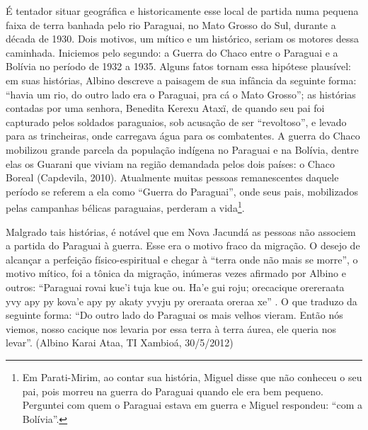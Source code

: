 \documentclass{article}
\begin{document}
\'E tentador situar geogr\'afica e historicamente esse local de partida
numa pequena faixa de terra banhada pelo rio Paraguai, no Mato Grosso
do Sul, durante a d\'ecada de 1930. Dois motivos, um m\'itico e um
hist\'orico, seriam os motores dessa caminhada. Iniciemos pelo segundo:
a Guerra do Chaco entre o Paraguai e a Bol\'ivia no per\'iodo de 1932 a
1935. Alguns fatos tornam essa hip\'otese plaus\'ivel: em suas
hist\'orias, Albino descreve a paisagem de sua inf\^ancia da seguinte
forma: {\textquotedblleft}havia um rio, do outro lado era o Paraguai,
pra c\'a o Mato Grosso{\textquotedblright}; as hist\'orias contadas por
uma senhora, Benedita Kerexu Atax\"i, de quando seu pai foi capturado
pelos soldados paraguaios, sob acusa\c{c}\~ao de ser
{\textquotedblleft}revoltoso{\textquotedblright}, e  levado para as
trincheiras, onde carregava \'agua para os combatentes. A guerra do
Chaco mobilizou grande parcela da popula\c{c}\~ao ind\'igena no
Paraguai e na Bol\'ivia, dentre elas os Guarani que viviam na regi\~ao
demandada pelos dois pa\'ises: o Chaco Boreal (Capdevila, 2010).
Atualmente muitas pessoas remanescentes daquele per\'iodo se referem a
ela como {\textquotedblleft}Guerra do Paraguai{\textquotedblright},
onde seus pais, mobilizados pelas campanhas b\'elicas paraguaias,
perderam a vida\footnote{ Em Parati-Mirim, ao contar sua hist\'oria,
Miguel disse que n\~ao conheceu o seu pai, pois morreu na guerra do
Paraguai quando ele era bem pequeno. Perguntei com quem o Paraguai
estava em guerra e Miguel respondeu: {\textquotedblleft}com a
Bol\'ivia{\textquotedblright}.}.

Malgrado tais hist\'orias, \'e not\'avel que em Nova Jacund\'a as
pessoas n\~ao associem a partida do Paraguai \`a guerra. Esse era o
motivo fraco da migra\c{c}\~ao. O desejo de alcan\c{c}ar a
perfei\c{c}\~ao f\'isico-espiritual e chegar \`a
{\textquotedblleft}terra onde n\~ao mais se morre{\textquotedblright},
o motivo m\'itico, foi a t\^onica da migra\c{c}\~ao, in\'umeras vezes
afirmado por Albino e outros: {\textquotedblleft}Paraguai rovai
kue{\textquoteright}i tuja kue ou. Ha{\textquoteright}e gui roju;
orecacique orereraata yvy apy py kova{\textquoteright}e apy py akaty
yvyju py oreraata oreraa xe{\textquotedblright} . O que traduzo da
seguinte forma: {\textquotedblleft}Do outro lado do Paraguai os mais
velhos vieram. Ent\~ao n\'os viemos, nosso cacique nos levaria por essa
terra \`a terra \'aurea, ele queria nos levar{\textquotedblright}.
(Albino Karai Ataa, TI Xambio\'a, 30/5/2012)
\end{document}
